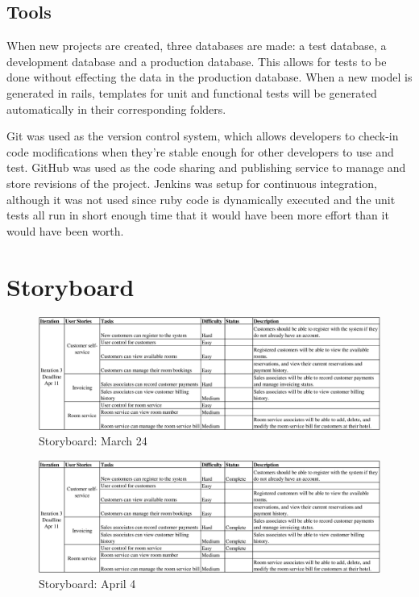 \documentclass[12pt]{elsarticle}
\begin{document}
\subsection{Tools}

When new projects are created, three databases are made: a test database, a development database and a production database. This allows for tests to be done without effecting the data in the production database. When a new model is generated in rails, templates for unit and functional tests will be generated automatically in their corresponding folders. 

Git was used as the version control system, which allows developers to check-in code modifications when they're stable enough for other developers to use and test. GitHub was used as the code sharing and publishing service to manage and store revisions of the project. Jenkins was setup for continuous integration, although it was not used since ruby code is dynamically executed and the unit tests all run in short enough time that it would have been more effort than it would have been worth.
\section{Storyboard}

\begin{figure}[!ht]
	\centering
	\includegraphics[scale=0.18]{images/storyboard_mar24}
	\caption{Storyboard: March 24}
\end{figure}

\begin{figure}[!ht]
	\centering
	\includegraphics[scale=0.18]{images/storyboard_apr4}
	\caption{Storyboard: April 4}
\end{figure}
\end{document}
